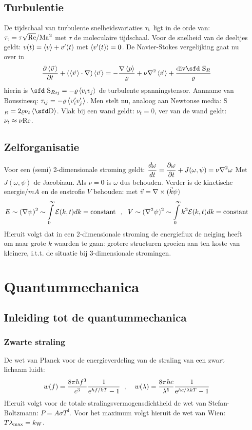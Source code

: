 \section{Turbulentie}
De tijdschaal van turbulente snelheidsvariaties $\tau_{\rm t}$ ligt in de
orde van: $\tau_{\rm t}=\tau\sqrt{\rm Re}/{\rm Ma^2}$ met $\tau$ de
moleculaire tijdschaal. Voor de snelheid van de deeltjes geldt:
$v(t)=\left\langle v \right\rangle+v'(t)$ met $\left\langle v'(t) \right\rangle=0$. De Navier-Stokes vergelijking gaat nu
over in
\[
\Q{\av{\vv\,}}{t}+(\av{\vv\,}\cdot\nabla)\av{\vv\,}=-\frac{\nabla\av{p}}{\varrho}+
\nu\nabla^2\av{\vv\,}+\frac{{\rm div}\mbox{\sfd S}_R}{\varrho}
\]
hierin is ${\mbox{\sfd S}_R}_{ij}=-\varrho\av{v_i v_j}$ de turbulente
spanningstensor. Aanname van Boussinesq: $\tau_{ij}=-\varrho\left\langle v_i'v_j' \right\rangle$. Men
stelt nu, analoog aan Newtonse media: {\sfd S}$_R=2\varrho\nu_t\av{\DD}$. Vlak
bij een wand geldt: $\nu_t=0$, ver van de wand geldt: $\nu_t\approx\nu{\rm Re}$.

\section{Zelforganisatie}
Voor een (semi) 2-dimensionale stroming geldt:
$\displaystyle\frac{d\omega}{dt}=\frac{\partial \omega}{\partial t}+J(\omega,\psi)=\nu\nabla^2\omega$
\npar
Met $J(\omega,\psi)$ de Jacobiaan. Als $\nu=0$ is $\omega$ dus behouden.
Verder is de kinetische energie$/mA$ en de enstrofie $V$ behouden: met
$\vec{v}=\nabla\times(\vec{k}\psi)$
\[
E\sim(\nabla\psi)^2\sim\int\limits_0^\infty {\cal E}(k,t)dk=\mbox{constant}~~,~~
V\sim(\nabla^2\psi)^2\sim\int\limits_0^\infty k^2{\cal E}(k,t)dk=\mbox{constant}
\]
Hieruit volgt dat in een 2-dimensionale stroming de energieflux de neiging
heeft om naar grote $k$ waarden te gaan: grotere structuren groeien aan ten
koste van kleinere, i.t.t. de situatie bij 3-dimensionale stromingen.

\chapter{Quantummechanica}
\section[~~Inleiding tot de quantummechanica]{Inleiding tot de quantummechanica}
\subsection{Zwarte straling}
De wet van Planck voor de energieverdeling van de straling van een zwart
lichaam luidt:
\[
w(f)=\frac{8\pi hf^3}{c^3}\frac{1}{{\rm e}^{hf/kT}-1}~~,~~~
w(\lambda)=\frac{8\pi hc}{\lambda^5}\frac{1}{{\rm e}^{hc/\lambda kT}-1}
\]
Hieruit volgt voor de totale stralingsvermogensdichtheid de wet van
Stefan-Boltzmann: $P=A\sigma T^4$. Voor het maximum volgt hieruit de wet van
Wien: $T\lambda_{\rm max}=k_{\rm W}$.

